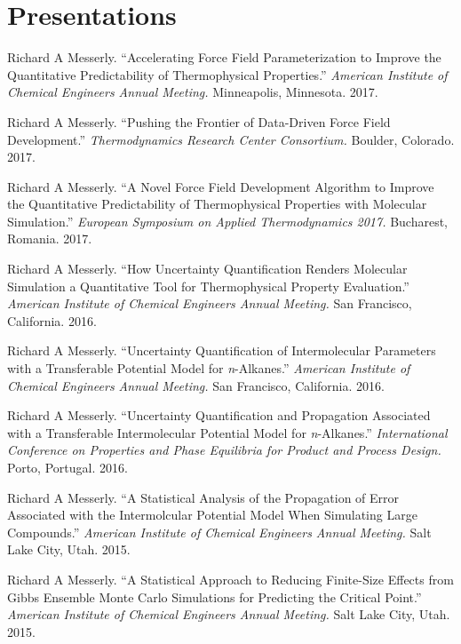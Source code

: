 \documentclass[12pt]{article}
\begin{document}
\section*{Presentations}

\begin{etaremune}
	
\item Richard A Messerly. ``Accelerating Force Field Parameterization to Improve the Quantitative Predictability of Thermophysical Properties.'' \textit{American Institute of Chemical Engineers Annual Meeting.} Minneapolis, Minnesota. 2017.
	
\item Richard A Messerly. ``Pushing the Frontier of Data-Driven Force Field Development.'' \textit{Thermodynamics Research Center Consortium.} Boulder, Colorado. 2017.
	
\item Richard A Messerly. ``A Novel Force Field Development Algorithm to Improve the Quantitative Predictability of Thermophysical Properties with Molecular Simulation.'' \textit{European Symposium on Applied Thermodynamics 2017.} Bucharest, Romania. 2017.

\item Richard A Messerly. ``How Uncertainty Quantification Renders Molecular Simulation a Quantitative Tool for Thermophysical Property Evaluation.'' \textit{American Institute of Chemical Engineers Annual Meeting.} San Francisco, California. 2016.

\item Richard A Messerly. ``Uncertainty Quantification of Intermolecular Parameters with a Transferable Potential Model for \textit{n}-Alkanes.'' \textit{American Institute of Chemical Engineers Annual Meeting.} San Francisco, California. 2016.

\item Richard A Messerly. ``Uncertainty Quantification and Propagation Associated with a Transferable Intermolecular Potential Model for \textit{n}-Alkanes.'' \textit{International Conference on Properties and Phase Equilibria for Product and Process Design.} Porto, Portugal. 2016.

\item Richard A Messerly. ``A Statistical Analysis of the Propagation of Error Associated with the Intermolcular Potential Model When Simulating Large Compounds.'' \textit{American Institute of Chemical Engineers Annual Meeting.} Salt Lake City, Utah. 2015.

\item Richard A Messerly. ``A Statistical Approach to Reducing Finite-Size Effects from Gibbs Ensemble Monte Carlo Simulations for Predicting the Critical Point.'' \textit{American Institute of Chemical Engineers Annual Meeting.} Salt Lake City, Utah. 2015.


\end{etaremune}
\end{document}
